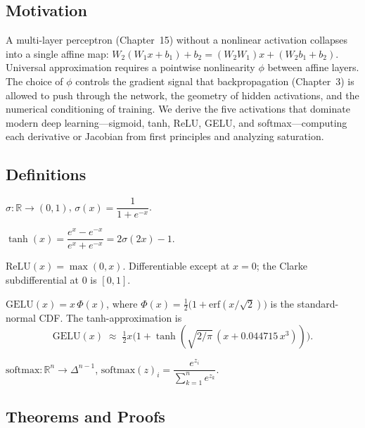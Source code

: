 \subsection*{Motivation}

A multi-layer perceptron (Chapter~15) without a nonlinear activation collapses into a single affine map: $W_2(W_1 x + b_1) + b_2 = (W_2 W_1) x + (W_2 b_1 + b_2)$. Universal approximation requires a pointwise nonlinearity $\phi$ between affine layers. The choice of $\phi$ controls the gradient signal that backpropagation (Chapter~3) is allowed to push through the network, the geometry of hidden activations, and the numerical conditioning of training. We derive the five activations that dominate modern deep learning---sigmoid, tanh, ReLU, GELU, and softmax---computing each derivative or Jacobian from first principles and analyzing saturation.

\subsection*{Definitions}

\begin{definition}[Sigmoid]
$\sigma:\mathbb{R}\to(0,1)$, $\sigma(x) = \dfrac{1}{1+e^{-x}}$.
\end{definition}

\begin{definition}
$\tanh(x) = \dfrac{e^x-e^{-x}}{e^x+e^{-x}} = 2\sigma(2x)-1$.
\end{definition}

\begin{definition}[ReLU]
$\mathrm{ReLU}(x) = \max(0,x)$. Differentiable except at $x=0$; the Clarke subdifferential at $0$ is $[0,1]$.
\end{definition}

\begin{definition}[GELU]
$\mathrm{GELU}(x) = x\,\Phi(x)$, where $\Phi(x) = \tfrac{1}{2}\bigl(1 + \mathrm{erf}(x/\sqrt{2})\bigr)$ is the standard-normal CDF. The tanh-approximation is
\[
\mathrm{GELU}(x) \;\approx\; \tfrac{1}{2}x\bigl(1 + \tanh(\sqrt{2/\pi}\,(x + 0.044715\,x^3))\bigr).
\]
\end{definition}

\begin{definition}[Softmax]
$\mathrm{softmax}:\mathbb{R}^n\to\Delta^{n-1}$, $\mathrm{softmax}(z)_i = \dfrac{e^{z_i}}{\sum_{k=1}^n e^{z_k}}$.
\end{definition}

\subsection*{Theorems and Proofs}

